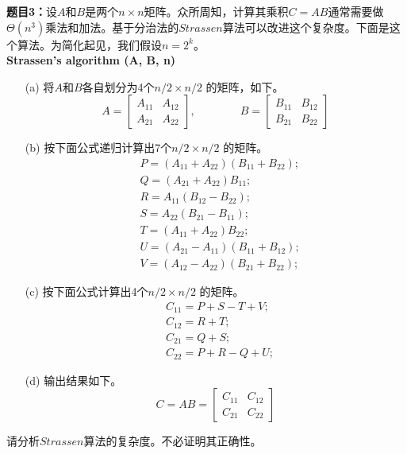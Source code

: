 \documentclass[12pt,a4paper]{ctexart}
\theoremstyle{definition}
\begin{document}
\vspace{10pt}
\noindent
{\bf 题目3：}设$A$和$B$是两个$n \times n$矩阵。众所周知，计算其乘积$C=AB$通常需要做$\Theta(n^{3})$乘法和加法。基于分治法的$Strassen$算法可以改进这个复杂度。下面是这个算法。为简化起见，我们假设$n=2^{k}$。 \\
{\bf Strassen's algorithm (A, B, n)}
\begin{enumerate}
    \item[(a)]  将$A$和$B$各自划分为4个$n/2 \times n/2$ 的矩阵，如下。\\
        $$
            A=
            \begin{bmatrix}
                A_{11} & A_{12} \\
                A_{21} & A_{22}
            \end{bmatrix}
            ,
            \qquad \qquad
            B=
            \begin{bmatrix}
                B_{11} & B_{12} \\
                B_{21} & B_{22}
            \end{bmatrix}
        $$
    \item[(b)]  按下面公式递归计算出7个$n/2 \times n/2$ 的矩阵。
        \begin{align*}
             & P=(A_{11}+A_{22})(B_{11}+B_{22}); \\
             & Q=(A_{21}+A_{22})B_{11};          \\
             & R=A_{11}(B_{12}-B_{22});          \\
             & S=A_{22}(B_{21}-B_{11});          \\
             & T=(A_{11}+A_{22})B_{22};          \\
             & U=(A_{21}-A_{11})(B_{11}+B_{12}); \\
             & V=(A_{12}-A_{22})(B_{21}+B_{22});
        \end{align*}
    \item[(c)]  按下面公式计算出4个$n/2 \times n/2$ 的矩阵。
        \begin{align*}
             & C_{11}=P+S-T+V; \\
             & C_{12}=R+T;     \\
             & C_{21}=Q+S;     \\
             & C_{22}=P+R-Q+U;
        \end{align*}
    \item[(d)]  输出结果如下。\\
        $$
            C=AB=
            \begin{bmatrix}
                C_{11} & C_{12} \\
                C_{21} & C_{22}
            \end{bmatrix}
        $$
\end{enumerate}
请分析$Strassen$算法的复杂度。不必证明其正确性。
\end{document}
